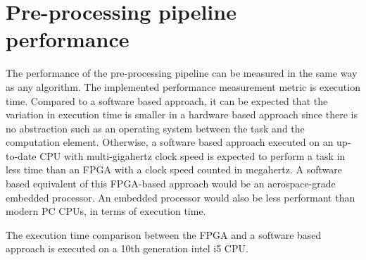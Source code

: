 \documentclass[12pt]{report}
\begin{document}


\section{Pre-processing pipeline performance}
The performance of the pre-processing pipeline can be measured in the same way as any algorithm. The implemented performance measurement metric is execution time. Compared to a software based approach, it can be expected that the variation in execution time is smaller in a hardware based approach since there is no abstraction such as an operating system between the task and the computation element. Otherwise, a software based approach executed on an up-to-date CPU with multi-gigahertz clock speed is expected to perform a task in less time than an FPGA with a clock speed counted in megahertz. A software based equivalent of this FPGA-based approach would be an aerospace-grade embedded processor. An embedded processor would also be less performant than modern PC CPUs, in terms of execution time.
\par
The execution time comparison between the FPGA and a software based approach is executed on a 10th generation intel i5 CPU. 
\end{document}
